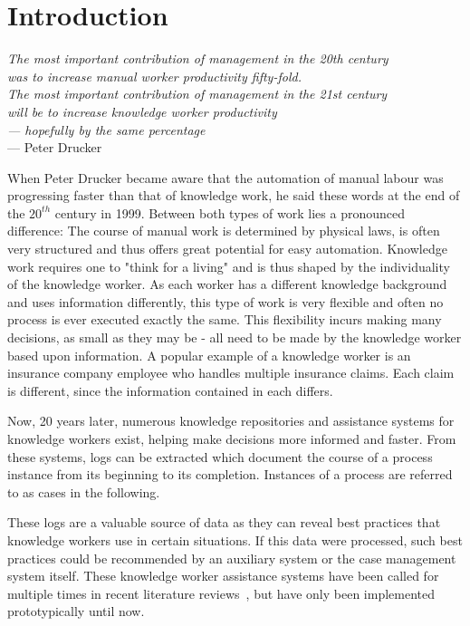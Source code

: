 \chapter{Introduction}\label{sec:intro}
\begin{flushright}{\slshape    
The most important contribution of management in the 20th century\\
was to increase manual worker productivity fifty-fold.\\
The most important contribution of management in the 21st century\\
will be to increase knowledge worker productivity\\
— hopefully by the same percentage} \\ \medskip
--- Peter Drucker~\cite{drucker1999}
\end{flushright}

When Peter Drucker became aware that the automation of manual labour was progressing faster than that of knowledge work, he said these words at the end of the $20^{th}$ century in 1999. Between both types of work lies a pronounced difference: The course of manual work is determined by physical laws, is often very structured and thus offers great potential for easy automation. Knowledge work requires one to "think for a living" and is thus shaped by the individuality of the knowledge worker. As each worker has a different knowledge background and uses information differently, this type of work is very flexible and often no process is ever executed exactly the same. This flexibility incurs making many decisions, as small as they may be - all need to be made by the knowledge worker based upon information. A popular example of a knowledge worker is an insurance company employee who handles multiple insurance claims. Each claim is different, since the information contained in each differs.

Now, 20 years later, numerous knowledge repositories and assistance systems for knowledge workers exist, helping make decisions more informed and faster. From these systems, logs can be extracted which document the course of a process instance from its beginning to its completion. Instances of a process are referred to as cases in the following.

These logs are a valuable source of data as they can reveal best practices that knowledge workers use in certain situations. If this data were processed, such best practices could be recommended by an auxiliary system or the case management system itself. These knowledge worker assistance systems have been called for multiple times in recent literature reviews~\cite{hauder2014, francescomarino2018}, but have only been implemented prototypically until now.

